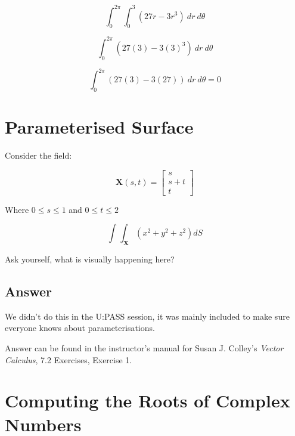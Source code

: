 \documentclass{article}
\begin{document}
\begin{equation}
  \int^{2 \pi}_{0}\int^{3}_{0} (27r-3r^3) \ dr \ d \theta
\end{equation}

\begin{equation}
  \int^{2 \pi}_{0} (27(3)-3(3)^3) \ dr \ d \theta
\end{equation}

\begin{equation}
  \int^{2 \pi}_{0} (27(3)-3(27)) \ dr \ d \theta = 0
\end{equation}

\clearpage
\section{Parameterised Surface}

Consider the field:

\begin{equation}
  \mathbf{X}(s,t) = \begin{bmatrix} s \\ s+t \\ t  \end{bmatrix}
\end{equation}

Where $0 \leq s \leq 1$ and $0 \leq t \leq 2$

\begin{equation}
  \int^{}_{}  \int^{}_{\mathbf{X}} \left( x^{2} + y^{2} + z^{2}  \right) dS
\end{equation}

Ask yourself, what is visually happening here?

\subsection{Answer}

We didn't do this in the U:PASS session, it was mainly included to make sure
everyone knows about parameterisations. 

Answer can be found in the instructor's manual for Susan J. Colley's 
\textit{Vector Calculus}, 7.2 Exercises, Exercise 1.

\clearpage
\section{Computing the Roots of Complex Numbers}
\end{document}
